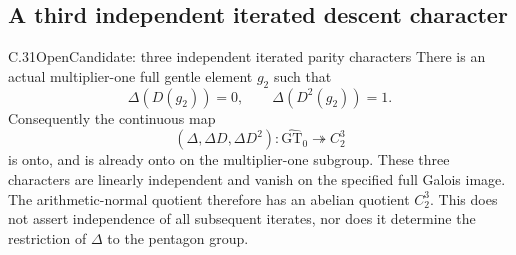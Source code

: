 \subsection{A third independent iterated descent character}

\begin{statement}{C.31}{Open}{Candidate: three independent iterated parity characters}
There is an actual multiplier-one full gentle element $g_2$ such that
\[
                 \Delta(D(g_2))=0,\qquad
                 \Delta(D^2(g_2))=1.
 \tag{C.31.1}
\]
Consequently the continuous map
\[
 (\Delta,\Delta D,\Delta D^2):
       \widehat{\mathrm{GT}}_0\twoheadrightarrow C_2^3
 \tag{C.31.2}
\]
is onto, and is already onto on the multiplier-one subgroup.
These three characters are linearly independent and vanish
on the specified full Galois image. The arithmetic-normal quotient
therefore has an abelian quotient $C_2^3$.
This does not assert independence of all subsequent iterates, nor
does it determine the restriction of $\Delta$ to the pentagon group.
\end{statement}

